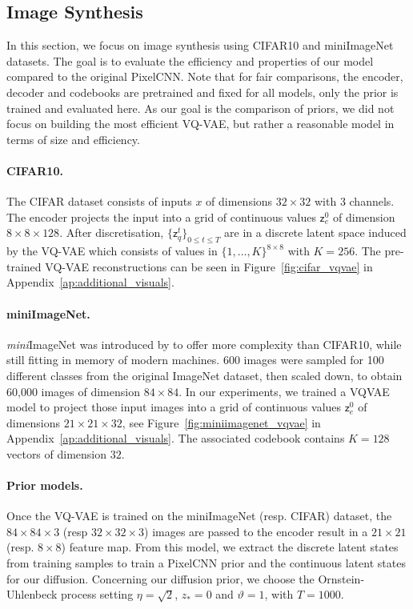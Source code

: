 \documentclass[nolayout]{article}
\theoremstyle{plain}
\theoremstyle{definition}
\theoremstyle{remark}
\newcommand{\latentcont}{\mathsf{z}_e}
\newcommand{\latentdis}{\mathsf{z}_q}
\begin{document}
\subsection{Image Synthesis}
In this section, we focus on image synthesis using CIFAR10 and miniImageNet datasets. The goal is to evaluate the efficiency and properties of our model compared to the original PixelCNN. Note that for fair comparisons, the encoder, decoder and codebooks are pretrained and fixed for all models, only the prior is trained and evaluated here. As our goal is the comparison of priors, we did not focus on building the most efficient VQ-VAE, but rather a reasonable model in terms of size and efficiency.

\paragraph{CIFAR10. }
 The CIFAR dataset consists of inputs $x$ of dimensions $32 \times 32$ with 3 channels. The encoder projects the input into a grid of continuous values $\latentcont^0$ of dimension $8 \times 8 \times 128$. After discretisation, $\{\latentdis^t\}_{0\leqslant t\leqslant T}$ are in a discrete latent space induced by the VQ-VAE which consists of values in $\{1,\ldots,K\}^{8 \times 8}$ with $K=256$. The pre-trained VQ-VAE reconstructions can be seen in Figure~\ref{fig:cifar_vqvae} in Appendix~\ref{ap:additional_visuals}.

\paragraph{miniImageNet. }
\textit{mini}ImageNet was introduced by \cite{Vinyals2016MatchingNF} to offer more complexity than CIFAR10, while still fitting in memory of modern machines.
600 images were sampled for 100 different classes from the original ImageNet dataset, then scaled down, to obtain 60,000 images of dimension $84 \times 84$.
In our experiments, we trained a VQVAE model to project those input images into a grid of continuous values $\latentcont^0$ of dimensions $21 \times 21 \times 32$, see Figure~\ref{fig:miniimagenet_vqvae} in Appendix~\ref{ap:additional_visuals}.
The associated codebook contains $K=128$ vectors of dimension $32$. 

\paragraph{Prior models. }
Once the VQ-VAE is trained on the miniImageNet (resp. CIFAR) dataset, the $84\times 84 \times 3$ (resp $32\times 32 \times 3$) images are passed to the encoder result in a $21 \times 21$ (resp. $8 \times 8$) feature map. From this model, we extract the discrete latent states from training samples to train a PixelCNN prior and the continuous latent states for our diffusion.
Concerning our diffusion prior, we choose the Ornstein-Uhlenbeck process setting $\eta = \sqrt{2}$, $z_*=0$ and $\vartheta = 1$, with $T=1000$. 
\end{document}

